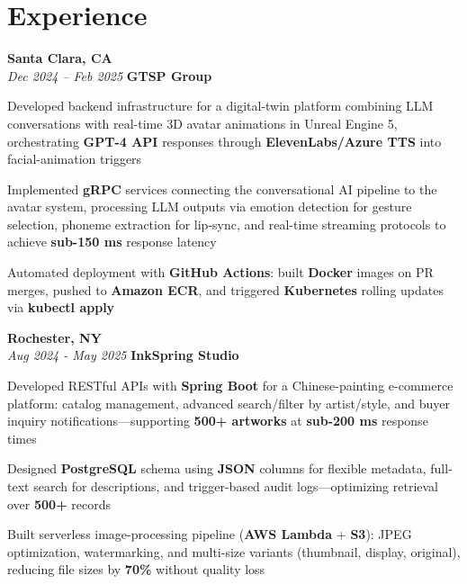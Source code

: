 \section{Experience}

\begin{twocolentry}{
    \textbf{Santa Clara, CA} \\
    \textit{Dec 2024 – Feb 2025}
}{
    \textbf{GTSP Group} \\
}
\end{twocolentry}
\begin{onecolentry}
    \begin{highlights}
        \item Developed backend infrastructure for a digital-twin platform combining LLM conversations with real-time 3D avatar animations in Unreal Engine 5, orchestrating \textbf{GPT-4 API} responses through \textbf{ElevenLabs/Azure TTS} into facial-animation triggers
        \item Implemented \textbf{gRPC} services connecting the conversational AI pipeline to the avatar system, processing LLM outputs via emotion detection for gesture selection, phoneme extraction for lip-sync, and real-time streaming protocols to achieve \textbf{sub-150 ms} response latency
        \item Automated deployment with \textbf{GitHub Actions}: built \textbf{Docker} images on PR merges, pushed to \textbf{Amazon ECR}, and triggered \textbf{Kubernetes} rolling updates via \textbf{kubectl apply}
    \end{highlights}
\end{onecolentry}

\vspace{0.2cm}

\begin{twocolentry}{
    \textbf{Rochester, NY} \\
    \textit{Aug 2024 - May 2025}
}{
    \textbf{InkSpring Studio} \\
}
\end{twocolentry}
\begin{onecolentry}
    \begin{highlights}
        \item Developed RESTful APIs with \textbf{Spring Boot} for a Chinese-painting e-commerce platform: catalog management, advanced search/filter by artist/style, and buyer inquiry notifications—supporting \textbf{500+ artworks} at \textbf{sub-200 ms} response times
        \item Designed \textbf{PostgreSQL} schema using \textbf{JSON} columns for flexible metadata, full-text search for descriptions, and trigger-based audit logs—optimizing retrieval over \textbf{500+} records
        \item Built serverless image-processing pipeline (\textbf{AWS Lambda} + \textbf{S3}): JPEG optimization, watermarking, and multi-size variants (thumbnail, display, original), reducing file sizes by \textbf{70\%} without quality loss
    \end{highlights}
\end{onecolentry}


